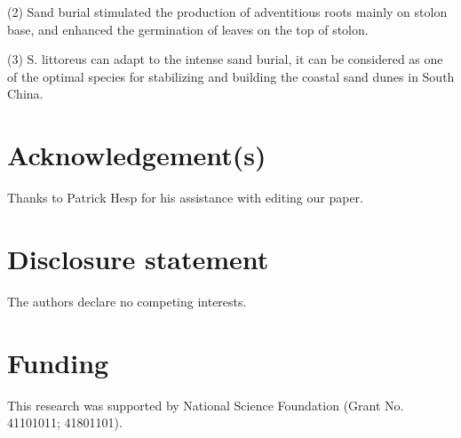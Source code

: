 \documentclass[]{interact}
\theoremstyle{plain}%
\theoremstyle{definition}
\theoremstyle{remark}
\begin{document}
(2) Sand burial stimulated the production of adventitious roots mainly on stolon base, and enhanced the germination of leaves on the top of stolon.

(3) S. littoreus can adapt to the intense sand burial, it can be considered as one of the optimal species for stabilizing and building the coastal sand dunes in South China. 


\section*{Acknowledgement(s)}

Thanks to Patrick Hesp for his assistance with editing our paper.

\section*{Disclosure statement}

The authors declare no competing interests. 

\section*{Funding}

This research was supported by National Science Foundation (Grant No. 41101011; 41801101). 


\end{document}

